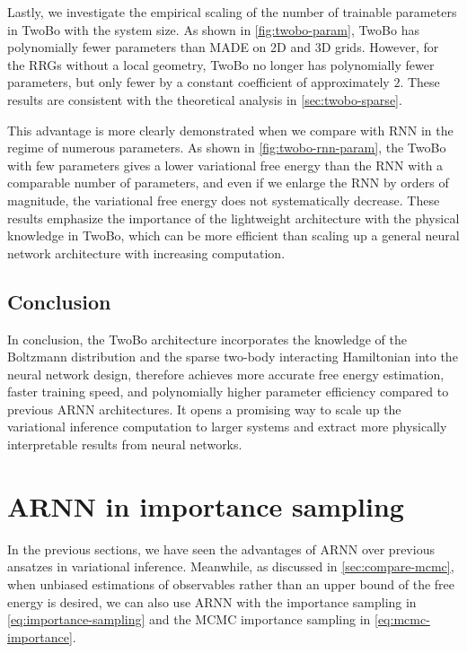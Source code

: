 Lastly, we investigate the empirical scaling of the number of trainable parameters in TwoBo with the system size. As shown in \cref{fig:twobo-param}, TwoBo has polynomially fewer parameters than MADE on 2D and 3D grids. However, for the RRGs without a local geometry, TwoBo no longer has polynomially fewer parameters, but only fewer by a constant coefficient of approximately $2$. These results are consistent with the theoretical analysis in \cref{sec:twobo-sparse}.

This advantage is more clearly demonstrated when we compare with RNN in the regime of numerous parameters. As shown in \cref{fig:twobo-rnn-param}, the TwoBo with few parameters gives a lower variational free energy than the RNN with a comparable number of parameters, and even if we enlarge the RNN by orders of magnitude, the variational free energy does not systematically decrease. These results emphasize the importance of the lightweight architecture with the physical knowledge in TwoBo, which can be more efficient than scaling up a general neural network architecture with increasing computation.

\subsection{Conclusion}

In conclusion, the TwoBo architecture incorporates the knowledge of the Boltzmann distribution and the sparse two-body interacting Hamiltonian into the neural network design, therefore achieves more accurate free energy estimation, faster training speed, and polynomially higher parameter efficiency compared to previous ARNN architectures. It opens a promising way to scale up the variational inference computation to larger systems and extract more physically interpretable results from neural networks.

\section{ARNN in importance sampling}
\label{sec:arnn-mcmc}

In the previous sections, we have seen the advantages of ARNN over previous ansatzes in variational inference. Meanwhile, as discussed in \cref{sec:compare-mcmc}, when unbiased estimations of observables rather than an upper bound of the free energy is desired, we can also use ARNN with the importance sampling in \cref{eq:importance-sampling} and the MCMC importance sampling in \cref{eq:mcmc-importance}.

